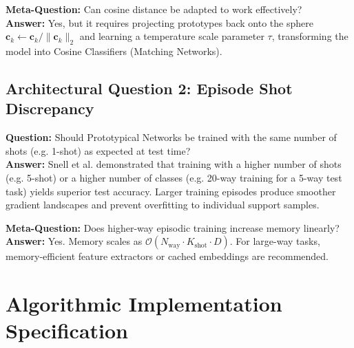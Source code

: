 \documentclass[11pt,a4paper]{article}
\theoremstyle{definition}
\begin{document}
\textbf{Meta-Question:} Can cosine distance be adapted to work effectively?\\
\textbf{Answer:} Yes, but it requires projecting prototypes back onto the sphere $\mathbf{c}_k \gets \mathbf{c}_k / \|\mathbf{c}_k\|_2$ and learning a temperature scale parameter $\tau$, transforming the model into Cosine Classifiers (Matching Networks).

\subsection{Architectural Question 2: Episode Shot Discrepancy}
\textbf{Question:} Should Prototypical Networks be trained with the same number of shots (e.g. 1-shot) as expected at test time?\\
\textbf{Answer:} Snell et al. demonstrated that training with a higher number of shots (e.g. 5-shot) or a higher number of classes (e.g. 20-way training for a 5-way test task) yields superior test accuracy. Larger training episodes produce smoother gradient landscapes and prevent overfitting to individual support samples.

\textbf{Meta-Question:} Does higher-way episodic training increase memory linearly?\\
\textbf{Answer:} Yes. Memory scales as $\mathcal{O}(N_{\text{way}} \cdot K_{\text{shot}} \cdot D)$. For large-way tasks, memory-efficient feature extractors or cached embeddings are recommended.

\section{Algorithmic Implementation Specification}
\end{document}
